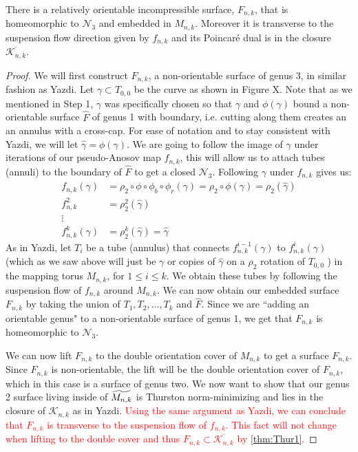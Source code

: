 \begin{lem}
\label{lem:genus3}
There is a relatively orientable incompressible surface, $F_{n,k}$, that is homeomorphic to $\mathcal{N}_3$ and embedded in $M_{n,k}$. Moreover it is transverse to the suspension flow direction given by $f_{n,k}$ and its Poincar\'e dual is in the closure $\overline{\mathcal{K}_{n,k}}$.
\end{lem}
\begin{proof}
    We will first construct $F_{n,k}$, a non-orientable surface of genus 3, in  similar fashion as Yazdi. Let $\gamma \subset T_{0,0}$ be the curve as shown in Figure X. Note that as we mentioned in Step 1, $\gamma$ was specifically chosen so that $\gamma$ and $\phi(\gamma)$ bound a non-orientable surface $\hat{F}$ of genus 1 with boundary, i.e. cutting along them creates an an annulus with a cross-cap. For ease of notation and to stay consistent with Yazdi, we will let $\hat{\gamma} = \phi(\gamma)$. We are going to follow the image of $\gamma$ under iterations of our pseudo-Anosov map $f_{n,k}$, this will allow us to attach tubes (annuli) to the boundary of $\hat{F}$ to get a closed $\mathcal{N}_3$. Following $\gamma$ under $f_{n,k}$ gives us:
    \begin{align*}
        f_{n,k}(\gamma) &= \rho_2 \circ \phi \circ \phi_b \circ \phi_r(\gamma) = \rho_2 \circ \phi(\gamma) = \rho_2(\hat{\gamma}) \\
        f^2_{n,k} &= \rho_2^2(\hat{\gamma}) \\
        \vdots& \\
        f^k_{n,k}(\gamma) &= \rho_2^k(\hat{\gamma}) = \hat{\gamma}
    \end{align*}
    As in Yazdi, let $T_i$ be a tube (annulus) that connects $f_{n,k}^{i-1}(\gamma)$ to $f_{n,k}^i(\gamma)$ (which as we saw above will just be $\gamma$ or copies of $\hat{\gamma}$ on a $\rho_2$ rotation of $T_{0,0}$ ) in the mapping torus $M_{n,k}$, for $1 \leq i \leq k$. We obtain these tubes by following the suspension flow of $f_{n,k}$ around $M_{n,k}$. We can now obtain our embedded surface $F_{n,k}$ by taking the union of $T_1,T_2,\dots,T_k$ and $\hat{F}$. Since we are ``adding an orientable genus" to a non-orientable surface of genus 1, we get that $F_{n,k}$ is homeomorphic to $\mathcal{N}_3$.


    We can now lift $F_{n,k}$ to the double orientation cover of $M_{n,k}$ to get a surface $F_{n,k}$. Since $F_{n,k}$ is non-orientable, the lift will be the double orientation cover of $F_{n,k}$, which in this case is a surface of genus two. We now want to show that our genus 2 surface living inside of $\widetilde{M_{n,k}}$ is Thurston norm-minimizing and lies in the closure of $\mathcal{K}_{n,k}$ as in Yazdi. \textcolor{red}{Using the same argument as Yazdi, we can conclude that $F_{n,k}$ is transverse to the suspension flow of $f_{n,k}$. This fact will not change when lifting to the double cover and thus $F_{n,k} \subset \overline{\mathcal{K}_{n,k}}$ by \ref{thm:Thur1}.}

\end{proof}

